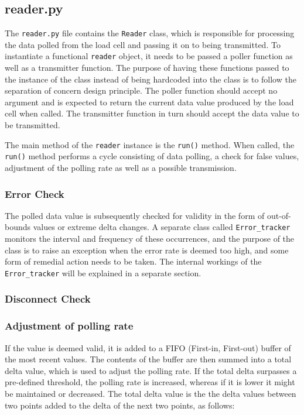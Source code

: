 \subsection{reader.py}
The \lstinline{reader.py} file contains the \lstinline{Reader} class, which is responsible for processing the data polled from the load cell and passing it on to being transmitted. To instantiate a functional \lstinline{reader} object, it needs to be passed a poller function as well as a transmitter function. The purpose of having these functions passed to the instance of the class instead of being hardcoded into the class is to follow the separation of concern design principle.\cite{sep-concern} The poller function should accept no argument and is expected to return the current data value produced by the load cell when called. The transmitter function in turn should accept the data value to be transmitted.

The main method of the \lstinline{reader} instance is the \lstinline{run()} method. When called, the \lstinline{run()} method performs a cycle consisting of data polling, a check for false values, adjustment of the polling rate as well as a possible transmission. 

\subsubsection{Error Check}
The polled data value is subsequently checked for validity in the form of out-of-bounds values or extreme delta changes. A separate class called \lstinline{Error_tracker} monitors the interval and frequency of these occurrences, and the purpose of the class is to raise an exception when the error rate is deemed too high, and some form of remedial action needs to be taken. The internal workings of the \lstinline{Error_tracker} will be explained in a separate section.

\subsubsection{Disconnect Check}

\subsubsection{Adjustment of polling rate}
If the value is deemed valid, it is added to a FIFO (First-in, First-out) buffer of the most recent values. The contents of the buffer are then summed into a total delta value, which is used to adjust the polling rate. If the total delta surpasses a pre-defined threshold, the polling rate is increased, whereas if it is lower it might be maintained or decreased. The total delta value is the the delta values between two points added to the delta of the next two points, as follows:

